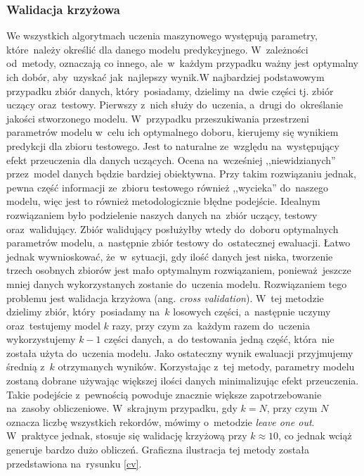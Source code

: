 \subsubsection{Walidacja krzyżowa}
We wszystkich algorytmach uczenia maszynowego występują parametry, które~należy określić dla danego modelu predykcyjnego. W~zależności od~metody, oznaczają co innego, ale~w~każdym przypadku ważny jest optymalny ich dobór, aby~uzyskać jak~najlepszy wynik.W najbardziej podstawowym przypadku zbiór danych, który~posiadamy, dzielimy na~dwie części tj. zbiór uczący oraz~testowy. Pierwszy z~nich służy do~uczenia, a~drugi do~określanie jakości stworzonego modelu. W~przypadku przeszukiwania przestrzeni parametrów modelu w~celu ich optymalnego doboru, kierujemy się wynikiem predykcji dla zbioru testowego. Jest to naturalne ze~względu na~występujący efekt przeuczenia dla danych uczących. Ocena na~wcześniej ,,niewidzianych'' przez~model danych będzie bardziej obiektywna. Przy takim rozwiązaniu jednak, pewna część informacji ze~zbioru testowego również ,,wycieka'' do~naszego modelu, więc jest to również metodologicznie błędne podejście. Idealnym rozwiązaniem było podzielenie naszych danych na~zbiór uczący, testowy oraz~walidujący. Zbiór walidujący posłużyłby wtedy do~doboru optymalnych parametrów modelu, a~następnie zbiór testowy do~ostatecznej ewaluacji. Łatwo jednak wywnioskować, że~w~sytuacji, gdy ilość danych jest niska, tworzenie trzech osobnych zbiorów jest mało optymalnym rozwiązaniem, ponieważ~jeszcze mniej danych wykorzystanych zostanie do~uczenia modelu. Rozwiązaniem tego problemu jest walidacja krzyżowa (ang. \textit{cross validation}). W~tej metodzie dzielimy zbiór, który~posiadamy na~$k$ losowych części, a~następnie uczymy oraz~testujemy model $k$ razy, przy czym za~każdym razem do~uczenia wykorzystujemy $k-1$ części danych, a~do testowania jedną część, która~nie została użyta do~uczenia modelu. Jako ostateczny wynik ewaluacji przyjmujemy średnią z~$k$ otrzymanych wyników. Korzystając z~tej metody, parametry modelu zostaną dobrane używając większej ilości danych minimalizując efekt przeuczenia. Takie podejście z~pewnością powoduje znacznie większe zapotrzebowanie na~zasoby obliczeniowe. W~skrajnym przypadku, gdy $k=N$, przy czym $N$ oznacza liczbę wszystkich rekordów, mówimy o~metodzie \textit{leave one out}. W~praktyce jednak, stosuje się walidację krzyżową przy $k \approx 10$, co jednak wciąż generuje bardzo dużo obliczeń. Graficzna ilustracja tej metody została przedstawiona na~rysunku \ref{cv}.

